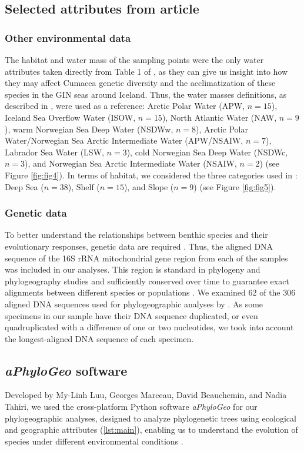 {\subsection{Selected attributes from article \cite{uhlir_adding_2021}} 
\subsubsection{Other environmental data} 
The habitat and water mass of the sampling points were the only water attributes taken directly from Table 1 of \citep{uhlir_adding_2021}, as they can give us insight into how they may affect Cumacea genetic diversity and the acclimatization of these species in the GIN seas around Iceland. Thus, the water masses definitions, as described in \citep{uhlir_adding_2021}, were used as a reference: Arctic Polar Water (APW, $n=15$), Iceland Sea Overflow Water (ISOW, $n=15$), North Atlantic Water (NAW, $n=9$), warm Norwegian Sea Deep Water (NSDWw, $n=8$), Arctic Polar Water/Norwegian Sea Arctic Intermediate Water (APW/NSAIW, $n=7$), Labrador Sea Water (LSW, $n=3$), cold Norwegian Sea Deep Water (NSDWc, $n=3$), and Norwegian Sea Arctic Intermediate Water (NSAIW, $n=2$) (see Figure \ref{fig:fig4}). In terms of habitat, we considered the three categories used in \citep{uhlir_adding_2021}: Deep Sea ($n=38$), Shelf ($n=15$), and Slope ($n=9$) (see Figure \ref{fig:fig5}).

\subsubsection{Genetic data} 
To better understand the relationships between benthic species and their evolutionary responses, genetic data are required \citep{uhlir_adding_2021}. Thus, the aligned DNA sequence of the 16S rRNA mitochondrial gene region from each of the samples was included in our analyses. This region is standard in phylogeny and phylogeography studies \citep{hugenholtz1998impact} and sufficiently conserved over time to guarantee exact alignments between different species or populations \citep{saccone1999evolutionary}. We examined 62 of the 306 aligned DNA sequences used for phylogeographic analyses by \citep{uhlir_adding_2021}. As some specimens in our sample have their DNA sequence duplicated, or even quadruplicated with a difference of one or two nucleotides, we took into account the longest-aligned DNA sequence of each specimen.

\subsection{{\textit{aPhyloGeo} software}\label{aPhyloGeo-software}}
Developed by My-Linh Luu, Georges Marceau, David Beauchemin, and Nadia Tahiri, we used the cross-platform Python software \textit{aPhyloGeo} for our phylogeographic analyses, designed to analyze phylogenetic trees using ecological and geographic attributes (\autoref{lst:main}), enabling us to understand the evolution of species under different environmental conditions \citep{koshkarov_phylogeography_2022}. 

}
